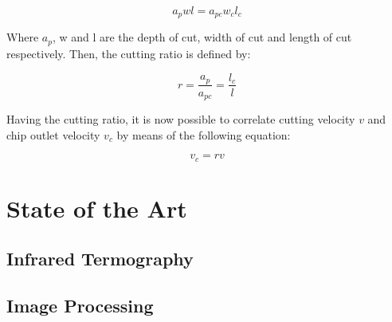 	\begin{equation} 
	\label{}
	a_{p}wl = a_{pc}w_{c}l_{c}
	\end{equation}

	Where $a_{p}$, w and l are the depth of cut, width of cut and length of cut respectively. Then, the cutting ratio is defined by:

	\begin{equation} 
	\label{}
	r = \frac{a_{p}}{a_{pc}} = \frac{l_{c}}{l}
	\end{equation}

	Having the cutting ratio, it is now possible to correlate cutting velocity $v$ and chip outlet velocity $v_{c}$ by means of the following equation:

	\begin{equation} 
	\label{}
	v_{c} = rv
	\end{equation}

\section{State of the Art}

\subsection{Infrared Termography}
	\label{sec:infrared}

\subsection{Image Processing}
	

